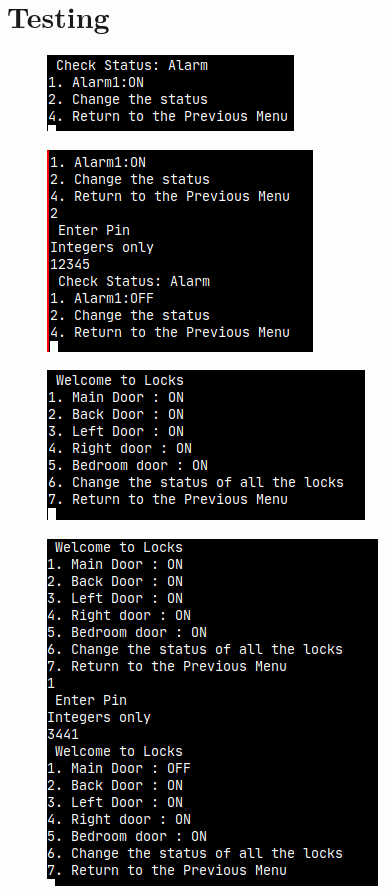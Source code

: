 \documentclass[11pt]{article}
\begin{document}
	\section{Testing}
	\begin{figure}[H]
		\centering
		\includegraphics[scale=0.7]{testing_change_alarmStatus}
		\caption[Testing Changing Alarm Status]{}
		\label{fig:testingchangealarmstatus}
	\end{figure}
	\begin{figure}[H]
		\centering
		\includegraphics[scale=0.7]{testing_changealarmstatus_pin}
		\caption[Testing changing alarm status with the pin]{}
		\label{fig:testingchangealarmstatuspin}
	\end{figure}
	\begin{figure}[H]
		\centering
		\includegraphics[scale=0.7]{testing_change_locksstatus}
		\caption[Testing change lock status]{}
		\label{fig:testingchangelocksstatus}
	\end{figure}
	\begin{figure}[H]
		\centering
		\includegraphics[scale=0.7]{testing_change_locksstatus_pin}
		\caption[Testing change lock status with pin]{}
		\label{fig:testingchangelocksstatuspin}
	\end{figure}
\end{document}
